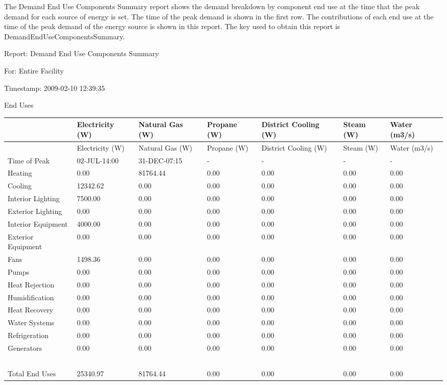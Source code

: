 The Demand End Use Components Summary report shows the demand breakdown by component end use at the time that the peak demand for each source of energy is set. The time of the peak demand is shown in the first row. The contributions of each end use at the time of the peak demand of the energy source is shown in this report. The key used to obtain this report is DemandEndUseComponentsSummary.

Report: Demand End Use Components Summary

For: Entire Facility

Timestamp: 2009-02-10 12:39:35

End Uses

{\scriptsize
\begin{longtable}[c]{>{\raggedright}p{0.85in}>{\raggedright}p{0.85in}>{\raggedright}p{0.85in}>{\raggedright}p{0.85in}>{\raggedright}p{0.85in}>{\raggedright}p{0.85in}>{\raggedright}p{0.85in}}
\toprule 
~ & Electricity (W) & Natural Gas (W) & Propane (W) & District Cooling (W) & Steam (W) & Water (m3/s) \tabularnewline
\midrule
\endfirsthead

\toprule 
~ & Electricity (W) & Natural Gas (W) & Propane (W) & District Cooling (W) & Steam (W) & Water (m3/s) \tabularnewline
\midrule
\endhead

Time of Peak & 02-JUL-14:00 & 31-DEC-07:15 & - & - & - & - \tabularnewline
Heating & 0.00 & 81764.44 & 0.00 & 0.00 & 0.00 & 0.00 \tabularnewline
Cooling & 12342.62 & 0.00 & 0.00 & 0.00 & 0.00 & 0.00 \tabularnewline
Interior Lighting & 7500.00 & 0.00 & 0.00 & 0.00 & 0.00 & 0.00 \tabularnewline
Exterior Lighting & 0.00 & 0.00 & 0.00 & 0.00 & 0.00 & 0.00 \tabularnewline
Interior Equipment & 4000.00 & 0.00 & 0.00 & 0.00 & 0.00 & 0.00 \tabularnewline
Exterior Equipment & 0.00 & 0.00 & 0.00 & 0.00 & 0.00 & 0.00 \tabularnewline
Fans & 1498.36 & 0.00 & 0.00 & 0.00 & 0.00 & 0.00 \tabularnewline
Pumps & 0.00 & 0.00 & 0.00 & 0.00 & 0.00 & 0.00 \tabularnewline
Heat Rejection & 0.00 & 0.00 & 0.00 & 0.00 & 0.00 & 0.00 \tabularnewline
Humidification & 0.00 & 0.00 & 0.00 & 0.00 & 0.00 & 0.00 \tabularnewline
Heat Recovery & 0.00 & 0.00 & 0.00 & 0.00 & 0.00 & 0.00 \tabularnewline
Water Systems & 0.00 & 0.00 & 0.00 & 0.00 & 0.00 & 0.00 \tabularnewline
Refrigeration & 0.00 & 0.00 & 0.00 & 0.00 & 0.00 & 0.00 \tabularnewline
Generators & 0.00 & 0.00 & 0.00 & 0.00 & 0.00 & 0.00 \tabularnewline
~ & ~ & ~ & ~ & ~ & ~ & ~ \tabularnewline
Total End Uses & 25340.97 & 81764.44 & 0.00 & 0.00 & 0.00 & 0.00 \tabularnewline
\bottomrule
\end{longtable}}


